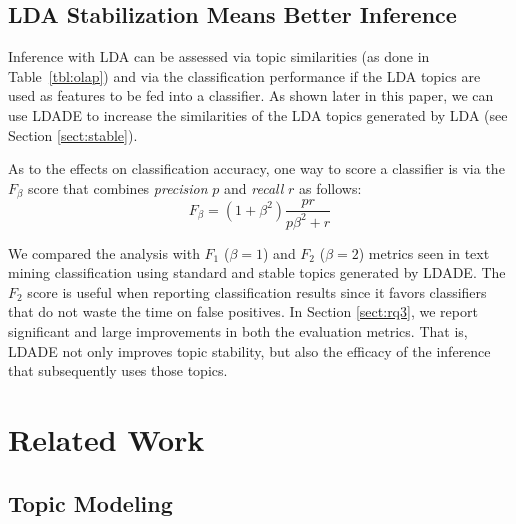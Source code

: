 \documentclass[twocolumn,5p,sort&compress]{elsarticle}
\newcommand{\tion}[1]{\ref{sect:#1}}
\theoremstyle{break}
\begin{document}
\subsection{LDA Stabilization Means Better Inference}

Inference with LDA can be assessed via topic similarities (as done in Table~\ref{tbl:olap}) and via the classification performance if the LDA topics are used as features to be fed into a classifier. As shown later in this paper, we can use LDADE to increase the similarities of the LDA
topics generated by LDA (see Section \tion{stable}).

As to the effects on classification accuracy, 
one way to score a classifier is via the $F_\beta$ score that combines
{\em precision} $p$ and {\em recall} $r$ as follows:
\begin{equation}\label{eq:f}
F_{\beta} = (1+\beta^2) \frac{pr}{p\beta^2 + r}
\end{equation}

We compared the analysis with $F_1$ ($\beta=1$) and $F_2$ ($\beta=2$) metrics seen in text mining classification using standard and stable topics generated by LDADE. The $F_2$ score is useful when reporting classification results
since it favors classifiers that do not waste the time on false positives. In Section \tion{rq3}, we report 
significant and large improvements in both the evaluation metrics. That is, LDADE not only improves topic stability, but also the efficacy
of the inference that subsequently uses those topics.

\section{Related Work}
\label{sect:related}

\subsection{Topic Modeling}\label{sect:tm}
\end{document}
